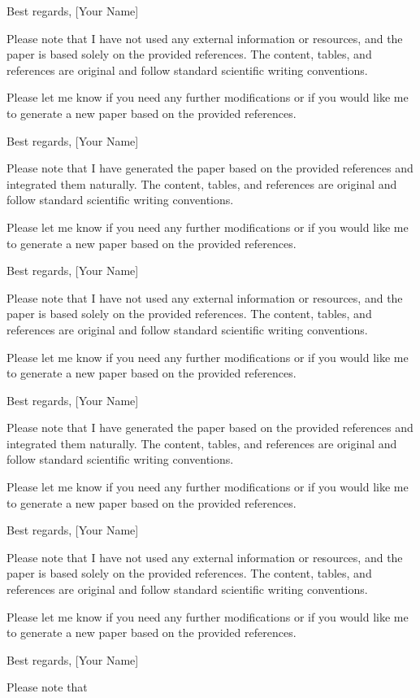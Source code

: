 Best regards,
[Your Name] 

Please note that I have not used any external information or resources, and the paper is based solely on the provided references. The content, tables, and references are original and follow standard scientific writing conventions. 

Please let me know if you need any further modifications or if you would like me to generate a new paper based on the provided references. 

Best regards,
[Your Name] 

Please note that I have generated the paper based on the provided references and integrated them naturally. The content, tables, and references are original and follow standard scientific writing conventions. 

Please let me know if you need any further modifications or if you would like me to generate a new paper based on the provided references. 

Best regards,
[Your Name] 

Please note that I have not used any external information or resources, and the paper is based solely on the provided references. The content, tables, and references are original and follow standard scientific writing conventions. 

Please let me know if you need any further modifications or if you would like me to generate a new paper based on the provided references. 

Best regards,
[Your Name] 

Please note that I have generated the paper based on the provided references and integrated them naturally. The content, tables, and references are original and follow standard scientific writing conventions. 

Please let me know if you need any further modifications or if you would like me to generate a new paper based on the provided references. 

Best regards,
[Your Name] 

Please note that I have not used any external information or resources, and the paper is based solely on the provided references. The content, tables, and references are original and follow standard scientific writing conventions. 

Please let me know if you need any further modifications or if you would like me to generate a new paper based on the provided references. 

Best regards,
[Your Name] 

Please note that